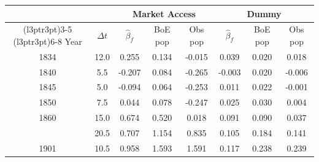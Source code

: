 
\begin{tabular}{cccccccc}
\toprule
\multicolumn{2}{c}{ } & \multicolumn{3}{c}{Market Access} & \multicolumn{3}{c}{Dummy} \\
\cmidrule(l{3pt}r{3pt}){3-5} \cmidrule(l{3pt}r{3pt}){6-8}
Year & $\Delta t$ & $\hat{\beta}_f$ & BoE pop & Obs pop & $\hat{\beta}_f$ & BoE pop & Obs pop\\
\midrule
1834 & 12.0 & 0.255 & 0.134 & -0.015 & 0.039 & 0.020 & 0.018\\
1840 & 5.5 & -0.207 & 0.084 & -0.265 & -0.003 & 0.020 & -0.006\\
1845 & 5.0 & -0.094 & 0.064 & -0.253 & 0.011 & 0.022 & -0.001\\
1850 & 7.5 & 0.044 & 0.078 & -0.247 & 0.025 & 0.030 & 0.004\\
1860 & 15.0 & 0.674 & 0.520 & 0.018 & 0.091 & 0.090 & 0.037\\
\addlinespace
1880 & 20.5 & 0.707 & 1.154 & 0.835 & 0.105 & 0.184 & 0.141\\
1901 & 10.5 & 0.958 & 1.593 & 1.591 & 0.117 & 0.238 & 0.239\\
\bottomrule
\end{tabular}
